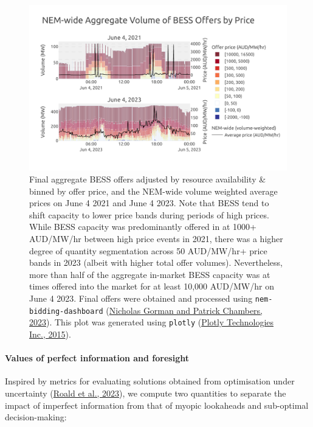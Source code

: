 \documentclass[12pt,a4paper,]{report}
\begin{document}
\begin{figure}
\hypertarget{fig:nem_bess_bidding}{%
\centering
\includegraphics{source/figures/aggregate_bess_bidding_0406_2021_2023.pdf}
\caption{Final aggregate BESS offers adjusted by resource availability
\& binned by offer price, and the NEM-wide volume weighted average
prices on June 4 2021 and June 4 2023. Note that BESS tend to shift
capacity to lower price bands during periods of high prices. While BESS
capacity was predominantly offered in at 1000+ AUD/MW/hr between high
price events in 2021, there was a higher degree of quantity segmentation
across 50 AUD/MW/hr+ price bands in 2023 (albeit with higher total offer
volumes). Nevertheless, more than half of the aggregate in-market BESS
capacity was at times offered into the market for at least 10,000
AUD/MW/hr on June 4 2023. Final offers were obtained and processed using
\texttt{nem-bidding-dashboard}
(\protect\hyperlink{ref-nicholasgormanNembiddingdashboard2023}{Nicholas
Gorman and Patrick Chambers, 2023}). This plot was generated using
\texttt{plotly}
(\protect\hyperlink{ref-plotlytechnologiesinc.CollaborativeDataScience2015}{Plotly
Technologies Inc., 2015}).}\label{fig:nem_bess_bidding}
}
\end{figure}

\hypertarget{values-of-perfect-information-and-foresight}{%
\paragraph{Values of perfect information and
foresight}\label{values-of-perfect-information-and-foresight}}

Inspired by metrics for evaluating solutions obtained from optimisation
under uncertainty
(\protect\hyperlink{ref-roaldPowerSystemsOptimization2023}{Roald et al.,
2023}), we compute two quantities to separate the impact of imperfect
information from that of myopic lookaheads and sub-optimal
decision-making:
\end{document}
